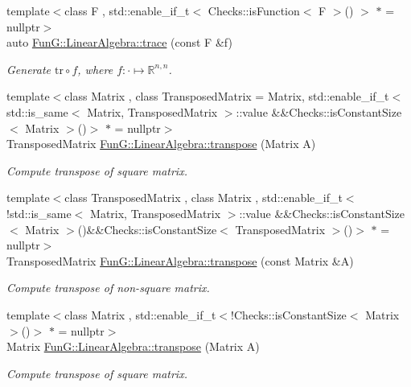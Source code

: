 \begin{DoxyCompactItemize}
{\footnotesize template$<$class F , std\+::enable\+\_\+if\+\_\+t$<$ Checks\+::is\+Function$<$ F $>$() $>$ $\ast$  = nullptr$>$ }\\auto \hyperlink{group__LinearAlgebraGroup_ga950717870525c43be79245413717673c}{Fun\+G\+::\+Linear\+Algebra\+::trace} (const F \&f)
\begin{DoxyCompactList}\small\item\em Generate $\mathrm{tr}\circ f$, where $f:\cdot\mapsto\mathbb{R}^{n,n} $. \end{DoxyCompactList}\item 
{\footnotesize template$<$class Matrix , class Transposed\+Matrix  = Matrix, std\+::enable\+\_\+if\+\_\+t$<$ std\+::is\+\_\+same$<$ Matrix, Transposed\+Matrix $>$\+::value \&\&\+Checks\+::is\+Constant\+Size$<$ Matrix $>$()$>$ $\ast$  = nullptr$>$ }\\Transposed\+Matrix \hyperlink{group__LinearAlgebraGroup_gaf299ac9490ae23da0a3a3d784e379d1f}{Fun\+G\+::\+Linear\+Algebra\+::transpose} (Matrix A)
\begin{DoxyCompactList}\small\item\em Compute transpose of square matrix. \end{DoxyCompactList}\item 
{\footnotesize template$<$class Transposed\+Matrix , class Matrix , std\+::enable\+\_\+if\+\_\+t$<$!std\+::is\+\_\+same$<$ Matrix, Transposed\+Matrix $>$\+::value \&\&\+Checks\+::is\+Constant\+Size$<$ Matrix $>$()\&\&\+Checks\+::is\+Constant\+Size$<$ Transposed\+Matrix $>$()$>$ $\ast$  = nullptr$>$ }\\Transposed\+Matrix \hyperlink{group__LinearAlgebraGroup_gaffe414459cb85a455a3c5a2099cfc6ee}{Fun\+G\+::\+Linear\+Algebra\+::transpose} (const Matrix \&A)
\begin{DoxyCompactList}\small\item\em Compute transpose of non-\/square matrix. \end{DoxyCompactList}\item 
{\footnotesize template$<$class Matrix , std\+::enable\+\_\+if\+\_\+t$<$!\+Checks\+::is\+Constant\+Size$<$ Matrix $>$()$>$ $\ast$  = nullptr$>$ }\\Matrix \hyperlink{group__LinearAlgebraGroup_gac3427d39b75727a255e5ea387c50ff10}{Fun\+G\+::\+Linear\+Algebra\+::transpose} (Matrix A)
\begin{DoxyCompactList}\small\item\em Compute transpose of square matrix. \end{DoxyCompactList}\item 

\end{DoxyCompactItemize}
